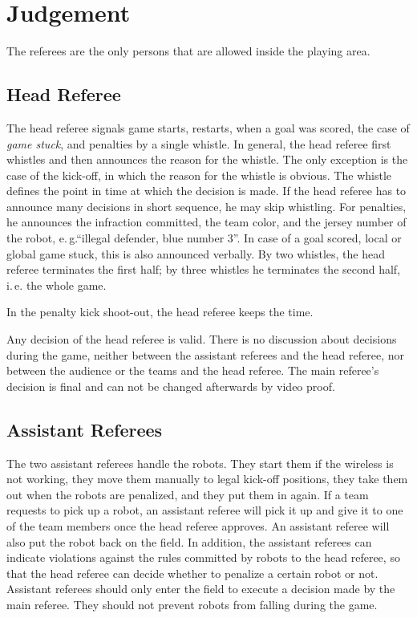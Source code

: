 \documentclass[12pt]{article}
\newcommand{\ie}{\mbox{i.\,e.}\xspace}
\newcommand{\eg}{\mbox{e.\,g.}\xspace}
\begin{document}
\newpage


\section{Judgement}

The referees are the only persons that are allowed inside the playing area.

\subsection{Head Referee}
\label{sec:head_referee}
The head referee signals game starts, restarts, when a goal was scored, the case of \emph{game stuck}, and penalties by a single whistle. In general, the head referee first whistles and then announces the reason for the whistle. The only exception is the case of the kick-off, in which the reason for the whistle is obvious. The whistle defines the point in time at which the decision is made. If the head referee has to announce many decisions in short sequence, he may skip whistling. For penalties, he announces the infraction committed, the team color, and the jersey number of the robot, \eg ``illegal defender, blue number 3''. In case of a goal scored, local or global game stuck, this is also announced verbally. By two whistles, the head referee terminates the first half; by three whistles he terminates the second half, \ie the whole game.

In the penalty kick shoot-out, the head referee keeps the time.

Any decision of the head referee is valid. There is no discussion about decisions during the game, neither between the assistant referees and the head referee, nor between the audience or the teams and the head referee. The main referee's decision is final and can not be changed afterwards by video proof.

\subsection{Assistant Referees}

The two assistant referees handle the robots. They start them if the wireless is not working, they move them manually to legal kick-off positions, they take them out when the robots are penalized, and they put them in again. If a team requests to pick up a robot, an assistant referee will pick it up and give it to one of the team members once the head referee approves. An assistant referee will also put the robot back on the field. In addition, the assistant referees can indicate violations against the rules committed by robots to the head referee, so that the head referee can decide whether to penalize a certain robot or not. Assistant referees should only enter the field to execute a decision made by the main referee. They should not prevent robots from falling during the game.
\end{document}
